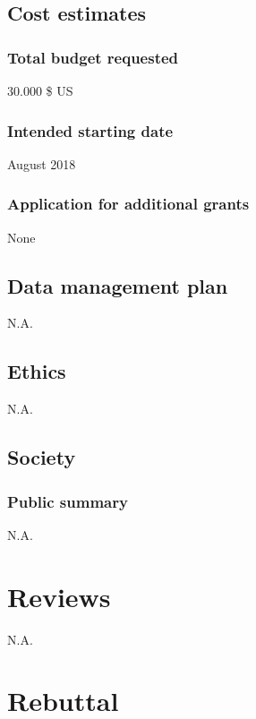 \documentclass[twocolumn, serif, rga, authordate]{jote-article}
\begin{document}
\subsection*{Cost estimates}



\subsubsection*{Total budget requested}


30.000 \$ US


\subsubsection*{Intended starting date}


August 2018


\subsubsection*{Application for additional grants}


None


\subsection*{Data management plan}


N.A.


\subsection*{Ethics}


N.A.


\subsection*{Society}



\subsubsection*{Public summary}


N.A.


\section*{Reviews}


N.A.


\section*{Rebuttal}
\end{document}
